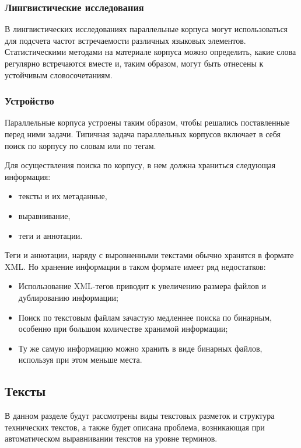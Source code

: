 \subsubsection*{Лингвистические исследования}

В лингвистических исследованиях параллельные корпуса могут использоваться для подсчета частот встречаемости различных языковых элементов.
Статистическими методами на материале корпуса можно определить, какие слова регулярно встречаются вместе и, таким образом, могут быть отнесены к устойчивым словосочетаниям. \cite[с. 81]{cl}

\subsubsection{Устройство}

Параллельные корпуса устроены таким образом, чтобы решались поставленные перед ними задачи.
Типичная задача параллельных корпусов включает в себя поиск по корпусу по словам или по тегам.

Для осуществления поиска по корпусу, в нем должна храниться следующая информация:
\begin{itemize}
    \item тексты и их метаданные,
    \item выравнивание,
    \item теги и аннотации.
\end{itemize}

Теги и аннотации, наряду с выровненными текстами обычно \cite{cl, survey, ruscorpora, opencorpora} хранятся в формате XML.
Но хранение информации в таком формате имеет ряд недостатков:
\begin{itemize}
    \item Использование XML-тегов приводит к увеличению размера файлов и дублированию информации;
    \item Поиск по текстовым файлам зачастую медленнее поиска по бинарным, особенно при большом количестве хранимой информации;
    \item Ту же самую информацию можно хранить в виде бинарных файлов, используя при этом меньше места.
\end{itemize}

\subsection{Тексты}

В данном разделе будут рассмотрены виды текстовых разметок и структура технических текстов, а также будет описана проблема, возникающая при автоматическом выравнивании текстов на уровне терминов.

